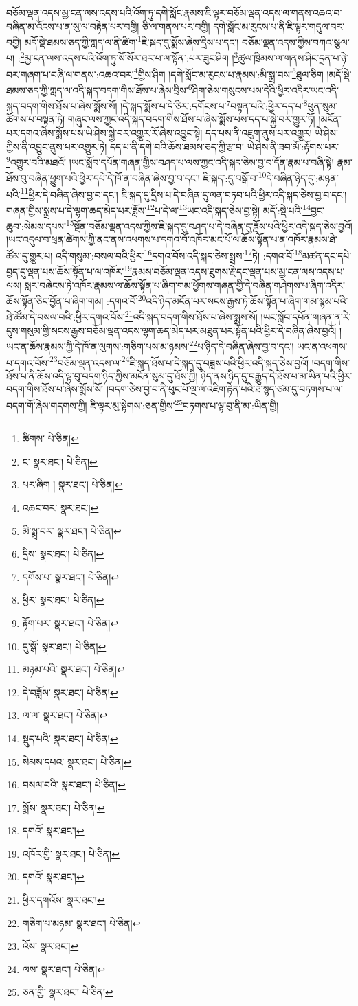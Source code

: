 བཅོམ་ལྡན་འདས་མྱ་ངན་ལས་འདས་པའི་འོག་ཏུ་དགེ་སློང་རྣམས་ཇི་ལྟར་བཅོམ་ལྡན་འདས་ལ་གནས་འཆའ་བ་བཞིན་མ་འོངས་པ་ན་སུ་ལ་བརྟེན་པར་བགྱི། ཅི་ལ་གནས་པར་བགྱི། དགེ་སློང་མ་རུངས་པ་ནི་ཇི་ལྟར་གདུལ་བར་བགྱི། མདོ་སྡེ་ཐམས་ཅད་ཀྱི་ཀླད་ལ་ནི་ཚིག་\footnote{ཚིགས་  པེ་ཅིན། }ཇི་སྐད་དུ་སྨོས་ཞེས་དྲིས་པ་དང་། བཅོམ་ལྡན་འདས་ཀྱིས་བཀའ་སྩལ་པ། :\footnote{ང་  སྣར་ཐང་།  པེ་ཅིན། }མྱ་ངན་ལས་འདས་པའི་འོག་ཏུ་སོ་སོར་ཐར་པ་ལ་སྟོན་:པར་ཟུང་ཤིག །\footnote{པར་ཞིག །  སྣར་ཐང་།  པེ་ཅིན། }ཚུལ་ཁྲིམས་ལ་གནས་ཤིང་དྲན་པ་ཉེ་བར་གཞག་པ་བཞི་ལ་གནས་:འཆའ་བར་\footnote{འཆང་བར་  སྣར་ཐང་། }གྱིས་ཤིག །དགེ་སློང་མ་རུངས་པ་རྣམས་:མི་སྨྲ་བས་\footnote{མི་སྨྲ་བར་  སྣར་ཐང་།  པེ་ཅིན། }ཐུལ་ཅིག །མདོ་སྡེ་ཐམས་ཅད་ཀྱི་ཀླད་ལ་འདི་སྐད་བདག་གིས་ཐོས་པ་ཞེས་བྲིས་\footnote{དྲིས་  སྣར་ཐང་།  པེ་ཅིན། }ཤིག་ཅེས་གསུངས་པས་དེའི་ཕྱིར་འདིར་ཡང་འདི་སྐད་བདག་གིས་ཐོས་པ་ཞེས་སྨོས་སོ། །དེ་སྐད་སྨོས་པ་དེ་ཅིར་:དགོངས་པ་\footnote{དགོས་པ་  སྣར་ཐང་།  པེ་ཅིན། }བསྟན་པའི་:ཕྱིར་དད་པ་\footnote{ཕྱིར་  སྣར་ཐང་།  པེ་ཅིན། }ཕུན་སུམ་ཚོགས་པ་བསྟན་ཏེ། གཞུང་ལས་ཀྱང་འདི་སྐད་བདག་གིས་ཐོས་པ་ཞེས་སྨོས་པས་དད་པ་སྐྱེ་བར་གྱུར་ཏོ། །མངོན་པར་དགའ་ཞེས་སྨོས་པས་ཡེ་ཤེས་སྐྱེ་བར་འགྱུར་རོ་ཞེས་འབྱུང་སྟེ། དད་པས་ནི་འཇུག་ནུས་པར་འགྱུར། ཡེ་ཤེས་ཀྱིས་ནི་འབྱུང་ནུས་པར་འགྱུར་ཏེ། དད་པ་ནི་དགེ་བའི་ཆོས་ཐམས་ཅད་ཀྱི་རྩ་བ། ཡེ་ཤེས་ནི་ཟབ་མོ་:རྟོགས་པར་\footnote{རྟོག་པར་  སྣར་ཐང་།  པེ་ཅིན། }འགྱུར་བའི་མཐའོ། །ཡང་སློབ་དཔོན་གཞན་གྱིས་བཤད་པ་ལས་ཀྱང་འདི་སྐད་ཅེས་བྱ་བ་དོན་རྣམ་པ་བཞི་སྟེ། རྣམ་ཐོས་བུ་བཞིན་ཕྱུག་པའི་ཕྱིར་དཔེ་དེ་ཁོ་ན་བཞིན་ཞེས་བྱ་བ་དང་། ཇི་སྐད་:དུ་བསྒོ་བ་\footnote{དུ་སྒོ་  སྣར་ཐང་།  པེ་ཅིན། }དེ་བཞིན་ཉིད་དུ་:མཉན་པའི་\footnote{མཉམ་པའི་  སྣར་ཐང་།  པེ་ཅིན། }ཕྱིར་དེ་བཞིན་ཞེས་བྱ་བ་དང་། ཇི་སྐད་དུ་དྲིས་པ་དེ་བཞིན་དུ་ལན་བཏབ་པའི་ཕྱིར་འདི་སྐད་ཅེས་བྱ་བ་དང་། གཞན་གྱིས་སྨྲས་པ་དེ་ལྷག་ཆད་མེད་པར་ཟློས་\footnote{དེ་བཟློས་  སྣར་ཐང་།  པེ་ཅིན། }པ་དེ་ལ་\footnote{ལ་ལ་  སྣར་ཐང་།  པེ་ཅིན། }ཡང་འདི་སྐད་ཅེས་བྱ་སྟེ། མདོ་:སྡེ་པའི་\footnote{སྡུད་པའི་  སྣར་ཐང་།  པེ་ཅིན། }བྱང་ཆུབ་:སེམས་དཔས་\footnote{སེམས་དཔའ་  སྣར་ཐང་།  པེ་ཅིན། }སྔོན་བཅོམ་ལྡན་འདས་ཀྱིས་ཇི་སྐད་དུ་བཤད་པ་དེ་བཞིན་དུ་ཟློས་པའི་ཕྱིར་འདི་སྐད་ཅེས་བྱའོ། །ཡང་འདུལ་བ་ཕྲན་ཚེགས་ཀྱི་ནང་ནས་འཕགས་པ་དགའ་བོ་འཁོར་མང་པོ་ལ་ཆོས་སྟོན་པ་ན་འཁོར་རྣམས་ཐེ་ཚོམ་དུ་གྱུར་པ། འདི་གསུམ་:བསལ་བའི་ཕྱིར་\footnote{བསལ་བའི་  སྣར་ཐང་།  པེ་ཅིན། }དགའ་བོས་འདི་སྐད་ཅེས་སྨྲས་\footnote{སྨོས་  སྣར་ཐང་།  པེ་ཅིན། }ཏེ། :དགའ་བོ་\footnote{དགའོ་  སྣར་ཐང་། }མཚན་དང་དཔེ་བྱད་དུ་ལྡན་པས་ཆོས་སྟོན་པ་ལ་འཁོར་\footnote{འཁོར་གྱི་  སྣར་ཐང་།  པེ་ཅིན། }རྣམས་བཅོམ་ལྡན་འདས་ཐུགས་རྗེ་དང་ལྡན་པས་མྱ་ངན་ལས་འདས་པ་ལས། སླར་བཞེངས་ཏེ་འཁོར་རྣམས་ལ་ཆོས་སྟོན་པ་ཞིག་གམ་ཕྱོགས་གཞན་གྱི་དེ་བཞིན་གཤེགས་པ་ཞིག་འདིར་ཆོས་སྟོན་ཅིང་བྱོན་པ་ཞིག་གམ། :དགའ་བོ་\footnote{དགའོ་  སྣར་ཐང་། }འདི་ཉིད་མངོན་པར་སངས་རྒྱས་ཏེ་ཆོས་སྟོན་པ་ཞིག་གམ་སྙམ་པའི་ཐེ་ཚོམ་དེ་བསལ་བའི་:ཕྱིར་དགའ་བོས་\footnote{ཕྱིར་དགའོས་  སྣར་ཐང་། }འདི་སྐད་བདག་གིས་ཐོས་པ་ཞེས་སྨྲས་སོ། །ཡང་སློབ་དཔོན་གཞན་ན་རེ་དུས་གསུམ་གྱི་སངས་རྒྱས་བཅོམ་ལྡན་འདས་ལྷག་ཆད་མེད་པར་མཐུན་པར་སྟོན་པའི་ཕྱིར་དེ་བཞིན་ཞེས་བྱའོ། །ཡང་ན་ཆོས་རྣམས་ཀྱི་དེ་ཁོ་ན་ལུགས་:གཅིག་པས་མ་ཉམས་\footnote{གཅིག་པ་མཉམ་  སྣར་ཐང་།  པེ་ཅིན། }པ་ཉིད་དེ་བཞིན་ཞེས་བྱ་བ་དང་། ཡང་ན་འཕགས་པ་དགའ་བོས་\footnote{འོས་  སྣར་ཐང་། }བཅོམ་ལྡན་འདས་ལ་\footnote{ལས་  སྣར་ཐང་།  པེ་ཅིན། }ཇི་སྐད་ཐོས་པ་དེ་སྐད་དུ་བཟླས་པའི་ཕྱིར་འདི་སྐད་ཅེས་བྱའོ། །བདག་གིས་ཐོས་པ་ནི་ཆོས་འདི་ལྟ་བུ་བདག་ཉིད་ཀྱིས་མངོན་སུམ་དུ་ཐོས་ཀྱི། ཉིད་ནས་ཉིད་དུ་བརྒྱུད་དེ་ཐོས་པ་མ་ཡིན་པའི་ཕྱིར་བདག་གིས་ཐོས་པ་ཞེས་སྨོས་སོ། །བདག་ཅེས་བྱ་བ་ནི་ཕུང་པོ་ལྔ་ལ་འཇིག་རྟེན་པའི་ཐ་སྙད་ཙམ་དུ་བཏགས་པ་ལ་བདག་གོ་ཞེས་གདགས་ཀྱི། ཇི་ལྟར་མུ་སྟེགས་:ཅན་གྱིས་\footnote{ཅན་གྱི་  སྣར་ཐང་།  པེ་ཅིན། }བཏགས་པ་ལྟ་བུ་ནི་མ་:ཡིན་གྱི། 
